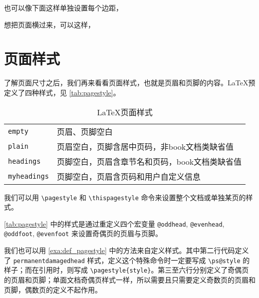 也可以像下面这样单独设置每个边距，

\begin{Code}[]
\usepackage[top=2in, bottom=1in, left=1in, right=1in]{geometry}
\end{Code}

想把页面横过来，可以这样，

\begin{Code}[]
\usepackage[landscape]{geometry}
\end{Code}

\section{页面样式}

了解页面尺寸之后，我们再来看看页面样式，也就是页眉和页脚的内容。\LaTeX 预定义了四种样式，见 \autoref{tab:pagestyle}。

\begin{table}[htbp]
\caption{\LaTeX 页面样式}
\label{tab:pagestyle}
\centering
\begin{tabular}{ll}
  \toprule
  \texttt{empty} & 页眉、页脚空白 \\
  \texttt{plain} & 页眉空白，页脚含居中页码，非book文档类缺省值 \\
  \texttt{headings} & 页脚空白，页眉含章节名和页码，book文档类缺省值 \\
  \texttt{myheadings} & 页脚空白，页眉含页码和用户自定义信息 \\
  \bottomrule
\end{tabular}
\end{table}

我们可以用 \verb|\pagestyle| 和 \verb|\thispagestyle| 命令来设置整个文档或单独某页的样式。

\begin{Code}[numbers=none]
\pagestyle{plain}    %
\thispagestyle{empty}%
\end{Code}

\autoref{tab:pagestyle} 中的样式是通过重定义四个宏变量 \texttt{@oddhead}, \texttt{@evenhead}, \texttt{@oddfoot}, \texttt{@evenfoot} 来设置奇偶页的页眉与页脚。

我们也可以用 \autoref{exa:def_pagestyle} 中的方法来自定义样式。其中第二行代码定义了 \texttt{permanentdamagedhead} 样式，定义这个特殊命令时一定要写成 \verb|\ps@style| 的样子；而在引用时，则写成 \verb|\pagestyle{style}|。第三至六行分别定义了奇偶页的页眉和页脚；单面文档奇偶页样式一样，所以需要且只需要定义奇数页的页眉和页脚，偶数页的定义不起作用。

